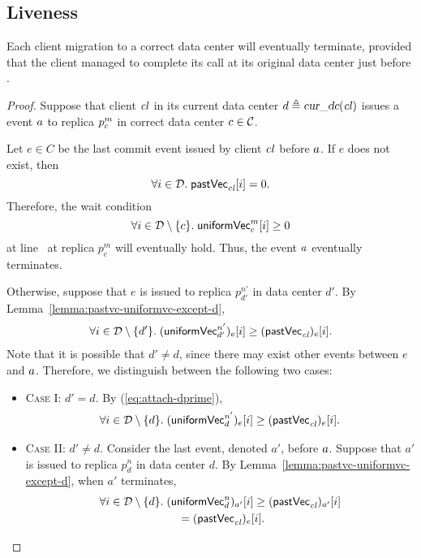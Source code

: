 
\subsection{\unistore{} Liveness} \label{ss:unistore-liveness}

\begin{applemma} \label{lemma:migrate-terminate}
  Each client migration \clattach{} to a correct data center
  will eventually terminate, provided that the client managed to
  complete its \fence{} call at its original data center
  just before \clattach.
\end{applemma}

\begin{proof} \label{proof:migrate-terminate}
  Suppose that client $\mathit{cl}$ in its current data center $d \triangleq \textsl{cur\_dc}(\mathit{cl})$
  issues a \clattach{} event $a$
  to replica $p^{m}_{c}$ in correct data center $c \in \mathcal{C}$.

  Let $e \in C$ be the last commit event
  issued by client $\mathit{cl}$ before $a$.
  If $e$ does not exist, then
  \[
    \forall i \in \mathcal{D}.\; {\sf pastVec}_{\mathit{cl}}[i] = 0.
  \]
  Therefore, the wait condition
  \[
    \forall i \in \mathcal{D} \setminus \{c\}.\; {\sf uniformVec}^{m}_{c}[i] \ge 0
  \]
  at line~\code{\ref{alg:unistore-replica}}{\ref{line:attach-wait-condition}}
  at replica $p^{m}_{c}$ will eventually hold.
  Thus, the \clattach{} event $a$ eventually terminates.

  Otherwise, suppose that $e$ is issued to replica $p^{n'}_{d'}$
  in data center $d'$.
  By Lemma~\ref{lemma:pastvc-uniformvc-except-d},
  \begin{align}
    \forall i \in \mathcal{D} \setminus \{d'\}.\;
      ({\sf uniformVec}^{n'}_{d'})_{e}[i] \ge ({\sf pastVec}_{\mathit{cl}})_{e}[i].
      \label{eq:attach-dprime}
  \end{align}
  Note that it is possible that $d' \neq d$,
  since there may exist other \clattach{} events between $e$ and $a$.
  Therefore, we distinguish between the following two cases:
  \begin{itemize}
    \item \textsc{Case I}: $d' = d$. By (\ref{eq:attach-dprime}),
      \begin{align}
        \forall i \in \mathcal{D} \setminus \{d\}.\;
          ({\sf uniformVec}^{n'}_{d})_{e}[i] \ge ({\sf pastVec}_{\mathit{cl}})_{e}[i].
          \label{eq:attach-dprime-d}
      \end{align}
    \item \textsc{Case II}: $d' \neq d$.
      Consider the last \clattach{} event, denoted $a'$, before $a$.
      Suppose that $a'$ is issued to replica $p^{n}_{d}$ in data center $d$.
      By Lemma~\ref{lemma:pastvc-uniformvc-except-d}, when $a'$ terminates,
      \begin{align}
        \forall i \in \mathcal{D} \setminus \{d\}.\;
          &({\sf uniformVec}^{n}_{d})_{a'}[i] \ge ({\sf pastVec}_{\mathit{cl}})_{a'}[i] \nonumber \\
          &\quad = ({\sf pastVec}_{\mathit{cl}})_{e}[i].
          \label{eq:attach-dprime-not-d}
      \end{align}
  \end{itemize}


\end{proof}
